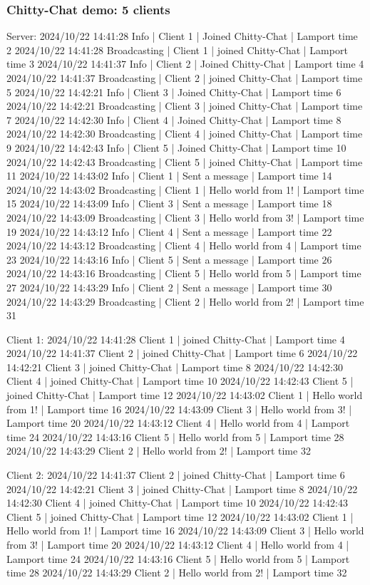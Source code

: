 \documentclass[a4paper,11pt]{article}
\begin{document}
\subsubsection*{Chitty-Chat demo: 5 clients}
Server:
2024/10/22 14:41:28 Info | Client 1 | Joined Chitty-Chat | Lamport time 2
2024/10/22 14:41:28 Broadcasting | Client 1 | joined Chitty-Chat | Lamport time 3
2024/10/22 14:41:37 Info | Client 2 | Joined Chitty-Chat | Lamport time 4
2024/10/22 14:41:37 Broadcasting | Client 2 | joined Chitty-Chat | Lamport time 5
2024/10/22 14:42:21 Info | Client 3 | Joined Chitty-Chat | Lamport time 6
2024/10/22 14:42:21 Broadcasting | Client 3 | joined Chitty-Chat | Lamport time 7
2024/10/22 14:42:30 Info | Client 4 | Joined Chitty-Chat | Lamport time 8
2024/10/22 14:42:30 Broadcasting | Client 4 | joined Chitty-Chat | Lamport time 9
2024/10/22 14:42:43 Info | Client 5 | Joined Chitty-Chat | Lamport time 10
2024/10/22 14:42:43 Broadcasting | Client 5 | joined Chitty-Chat | Lamport time 11
2024/10/22 14:43:02 Info | Client 1 | Sent a message | Lamport time 14
2024/10/22 14:43:02 Broadcasting | Client 1 | Hello world from 1! | Lamport time 15
2024/10/22 14:43:09 Info | Client 3 | Sent a message | Lamport time 18
2024/10/22 14:43:09 Broadcasting | Client 3 | Hello world from 3! | Lamport time 19
2024/10/22 14:43:12 Info | Client 4 | Sent a message | Lamport time 22
2024/10/22 14:43:12 Broadcasting | Client 4 | Hello world from 4 | Lamport time 23
2024/10/22 14:43:16 Info | Client 5 | Sent a message | Lamport time 26
2024/10/22 14:43:16 Broadcasting | Client 5 | Hello world from 5 | Lamport time 27
2024/10/22 14:43:29 Info | Client 2 | Sent a message | Lamport time 30
2024/10/22 14:43:29 Broadcasting | Client 2 | Hello world from 2! | Lamport time 31

Client 1:
2024/10/22 14:41:28 Client 1 | joined Chitty-Chat | Lamport time 4
2024/10/22 14:41:37 Client 2 | joined Chitty-Chat | Lamport time 6
2024/10/22 14:42:21 Client 3 | joined Chitty-Chat | Lamport time 8
2024/10/22 14:42:30 Client 4 | joined Chitty-Chat | Lamport time 10
2024/10/22 14:42:43 Client 5 | joined Chitty-Chat | Lamport time 12
2024/10/22 14:43:02 Client 1 | Hello world from 1! | Lamport time 16
2024/10/22 14:43:09 Client 3 | Hello world from 3! | Lamport time 20
2024/10/22 14:43:12 Client 4 | Hello world from 4 | Lamport time 24
2024/10/22 14:43:16 Client 5 | Hello world from 5 | Lamport time 28
2024/10/22 14:43:29 Client 2 | Hello world from 2! | Lamport time 32

Client 2:
2024/10/22 14:41:37 Client 2 | joined Chitty-Chat | Lamport time 6
2024/10/22 14:42:21 Client 3 | joined Chitty-Chat | Lamport time 8
2024/10/22 14:42:30 Client 4 | joined Chitty-Chat | Lamport time 10
2024/10/22 14:42:43 Client 5 | joined Chitty-Chat | Lamport time 12
2024/10/22 14:43:02 Client 1 | Hello world from 1! | Lamport time 16
2024/10/22 14:43:09 Client 3 | Hello world from 3! | Lamport time 20
2024/10/22 14:43:12 Client 4 | Hello world from 4 | Lamport time 24
2024/10/22 14:43:16 Client 5 | Hello world from 5 | Lamport time 28
2024/10/22 14:43:29 Client 2 | Hello world from 2! | Lamport time 32
\end{document}
